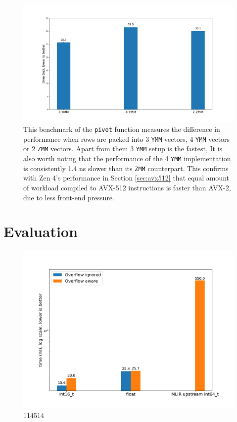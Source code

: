\documentclass[logo,bsc,singlespacing,parskip]{infthesis}
\newcommand{\pivot}{\texttt{pivot}}
\newcommand{\ymm}{\texttt{YMM}}
\newcommand{\zmm}{\texttt{ZMM}}
\begin{document}
\begin{figure}[H]
    \begin{center}
        \includegraphics[width=\linewidth]{image/3ymm-4ymm-2zmm.png}
    \end{center}
    \caption{This benchmark of the \pivot{} function measures the difference in
    performance when rows are packed into 3 \ymm{} vectors, 4 \ymm{} vectors or 2 \zmm{}
    vectors. Apart from them 3 \ymm{} setup is the fastest, It is also worth noting
    that the performance of the 4 \ymm{} implementation is consistently 1.4 ns
    slower than its \zmm{} counterpart. This confirms with Zen 4's performance
    in Section \ref{sec:avx512} that equal amount of workload compiled to
    AVX-512 instructions is faster than AVX-2, due to less front-end pressure.  
    }
    \label{fig:3ymm-4ymm-2zmm}
\end{figure}








\section{Evaluation}
\begin{figure}[H]
    \begin{center}
        \includegraphics[width=\linewidth]{image/i16-3ymmf32-upstream-overflow.png}
    \end{center}
    \caption{ 114514
    }

    \label{fig:i16-3ymmf32-upstream-overflow}
\end{figure}
\end{document}
